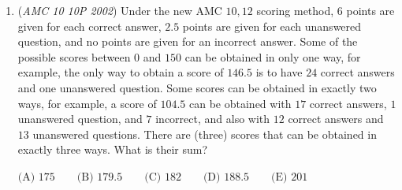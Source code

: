 \begin{enumerate}
 When $n = 18$, $\frac{n(n+1)(2n+1)}{6} = 1785 + 18^2 = 2109 > 2002$.

 Therefore, we know $n \leq 17$.

 Now we must show that $n = 17$ works. We replace some integer $b$ within the set $\{1, 2, ... 17\}$ with an integer $a > 17$ to account for the amount under $2002$, which is $2002-1785 = 217$.

 Essentially, this boils down to writing $217$ as a difference of squares. Assume there exist positive integers $a$ and $b$ where $a > 17$ and $b \leq 17$ such that $a^2 - b^2 = 217$.

 We can rewrite this as $(a+b)(a-b) = 217$. Since $217 = 7 \cdot 31$, either $a+b = 217$ and $a-b = 1$ or $a+b = 31$ and $a-b = 7$. We analyze each case separately.

 Case 1: $a+b = 217$ and $a-b = 1$

 Solving this system of equations gives $a = 109$ and $b = 108$. However, $108 > 17$, so this case does not yield a solution.

 Case 2: $a+b = 31$ and $a-b = 7$

 Solving this system of equations gives $a = 19$ and $b = 12$. This satisfies all the requirements of the problem.

 The list $1, 2 ... 11, 13, 14 ... 17, 19$ has $17$ terms whose sum of squares equals $2002$. Since $n \geq 18$ is impossible, the answer is $\boxed {\textbf{(D) }17}$.

 


	\item (\textit{AMC 10 10P 2002}) Under the new AMC $10, 12$ scoring method, $6$ points are given for each correct answer, $2.5$ points are given for each unanswered question, and no points are given for an incorrect answer. Some of the possible scores between $0$ and $150$ can be obtained in only one way, for example, the only way to obtain a score of $146.5$ is to have $24$ correct answers and one unanswered question. Some scores can be obtained in exactly two ways, for example, a score of $104.5$ can be obtained with $17$ correct answers, $1$ unanswered question, and $7$ incorrect, and also with $12$ correct answers and $13$ unanswered questions. There are (three) scores that can be obtained in exactly three ways. What is their sum?


 

$\text{(A) }175 \qquad \text{(B) }179.5 \qquad \text{(C) }182 \qquad \text{(D) }188.5 \qquad \text{(E) }201$


\end{enumerate}
